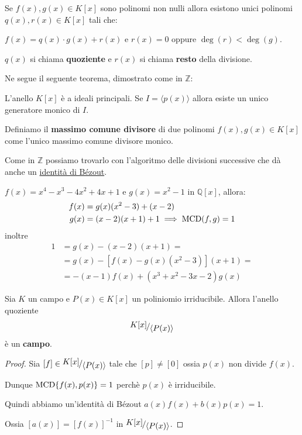 \documentclass[../main.tex]{subfiles}
\begin{document}
Se $f(x), g(x) \in K[x]$ sono polinomi non nulli allora esistono unici polinomi $q(x), r(x) \in K[x]$ tali che:

$f(x) = q(x) \cdot g(x) + r(x)$ e $r(x) = 0$ oppure $\deg(r) < \deg(g)$.

$q(x)$ si chiama \textbf{quoziente} e $r(x)$ si chiama \textbf{resto} della divisione.

Ne segue il seguente teorema, dimostrato come in $\mathbb{Z}$:
\begin{theorem}
    L'anello $K[x]$ è a ideali principali. Se $I = \langle p(x)\rangle$ allora esiste un unico generatore monico di $I$.
\end{theorem}

\begin{definition}
    Definiamo il \textbf{massimo comune divisore} di due polinomi $f(x), g(x) \in K[x]$ come l'unico massimo comune divisore monico.
\end{definition}

Come in $\mathbb{Z}$ possiamo trovarlo con l'algoritmo delle divisioni successive che dà anche un \underline{identità di Bézout}.

\begin{example}
    $f(x) = x^4 - x^3 -4x^2 + 4x + 1$ e $g(x) = x^2 - 1$ in $\mathbb{Q}[x]$, allora:
    \begin{align*}
        f(x) & = g(x)(x^2 - 3) + (x - 2)                  \\
        g(x) & = (x - 2)(x + 1) +1 \implies \operatorname{MCD}(f,g) = 1
    \end{align*}
    inoltre
    \begin{align*}
        1 & = g(x) - (x - 2)(x + 1) =                \\
          & = g(x) - [f(x) - g(x)(x^2 - 3)](x + 1) = \\
          & = -(x - 1)f(x) + (x^3 + x^2 - 3x -2)g(x)
    \end{align*}
\end{example}

\begin{proposition}
    Sia $K$ un campo e $P(x) \in K[x]$ un poliniomio irriducibile. Allora l'anello quoziente
    \[
        \nicefrac{K[x]}{\langle P(x)\rangle}
    \]
    è un \textbf{campo}.
\end{proposition}

\begin{proof}
    Sia $[f] \in \nicefrac{K[x]}{\langle P(x)\rangle}$ tale che $[p] \neq [0]$ ossia $p(x)$ non divide $f(x)$.

    Dunque $\operatorname{MCD}\{f(x),p(x)\} = 1$ perchè $p(x)$ è irriducibile.

    Quindi abbiamo un'identità di Bézout $a(x)f(x) + b(x)p(x) = 1$.

    Ossia $[a(x)] = [f(x)]^{-1}$ in $\nicefrac{K[x]}{\langle P(x)\rangle}$.
\end{proof}
\end{document}
